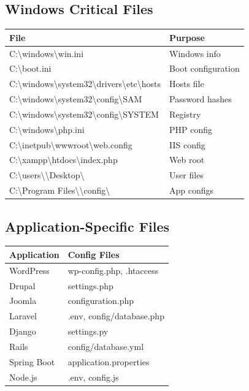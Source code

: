 \documentclass[12pt]{article}
\begin{document}
\subsection{Windows Critical Files}

\begin{longtable}{|l|l|}
\hline
\textbf{File} & \textbf{Purpose} \\
\hline
C:\textbackslash windows\textbackslash win.ini & Windows info \\
\hline
C:\textbackslash boot.ini & Boot configuration \\
\hline
C:\textbackslash windows\textbackslash system32\textbackslash drivers\textbackslash etc\textbackslash hosts & Hosts file \\
\hline
C:\textbackslash windows\textbackslash system32\textbackslash config\textbackslash SAM & Password hashes \\
\hline
C:\textbackslash windows\textbackslash system32\textbackslash config\textbackslash SYSTEM & Registry \\
\hline
C:\textbackslash windows\textbackslash php.ini & PHP config \\
\hline
C:\textbackslash inetpub\textbackslash wwwroot\textbackslash web.config & IIS config \\
\hline
C:\textbackslash xampp\textbackslash htdocs\textbackslash index.php & Web root \\
\hline
C:\textbackslash users\textbackslash *\textbackslash Desktop\textbackslash * & User files \\
\hline
C:\textbackslash Program Files\textbackslash *\textbackslash config\textbackslash * & App configs \\
\hline
\end{longtable}

\subsection{Application-Specific Files}

\begin{longtable}{|l|l|}
\hline
\textbf{Application} & \textbf{Config Files} \\
\hline
WordPress & wp-config.php, .htaccess \\
\hline
Drupal & settings.php \\
\hline
Joomla & configuration.php \\
\hline
Laravel & .env, config/database.php \\
\hline
Django & settings.py \\
\hline
Rails & config/database.yml \\
\hline
Spring Boot & application.properties \\
\hline
Node.js & .env, config.js \\
\hline
\end{longtable}
\end{document}
